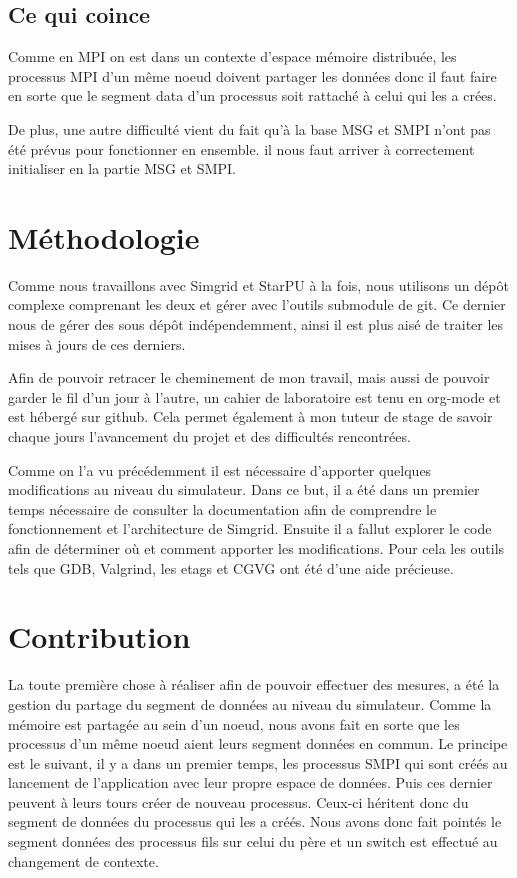 \documentclass[smallextended]{svjour3}
\begin{document}
\subsection{Ce qui coince}
\label{sec-3-4}
Comme en MPI on est dans un contexte d'espace mémoire distribuée,
les processus MPI d'un même noeud doivent partager les données donc
il faut faire en sorte que le segment data d'un processus soit
rattaché à celui qui les a crées. 

De plus, une autre difficulté vient du fait qu'à la base MSG et
SMPI n'ont pas été prévus pour fonctionner en ensemble. il nous
faut arriver à correctement initialiser en la partie MSG et SMPI.

\section{Méthodologie}
\label{sec-4}
Comme nous travaillons avec Simgrid et StarPU à la fois, nous
utilisons un dépôt complexe comprenant les deux et gérer avec
l'outils submodule de git. Ce dernier nous de gérer des sous dépôt
indépendemment, ainsi il est plus aisé de traiter les mises à jours
de ces derniers.

Afin de pouvoir retracer le cheminement de mon travail, mais aussi
de pouvoir garder le fil d'un jour à l'autre, un cahier de
laboratoire est tenu en org-mode et est hébergé sur github. Cela permet
également à mon tuteur de stage de savoir chaque jours l'avancement
du projet et des difficultés rencontrées.

Comme on l'a vu précédemment il est nécessaire d'apporter quelques
modifications au niveau du simulateur. Dans ce but, il a été dans un premier
temps nécessaire de consulter la documentation afin de comprendre le 
fonctionnement et l'architecture de Simgrid. Ensuite il a fallut
explorer le code afin de déterminer où et comment apporter les
modifications. Pour cela les outils tels que GDB, Valgrind, les
etags et CGVG ont été d'une aide précieuse.

\section{Contribution}
\label{sec-5}
La toute première chose à réaliser afin de pouvoir effectuer des
mesures, a été la gestion du partage du segment de données au niveau
du simulateur. Comme la mémoire est partagée au sein d'un noeud, nous
avons fait en sorte que les processus d'un même noeud aient leurs
segment données en commun. Le principe est le suivant, il y a dans
un premier temps, les processus SMPI qui sont créés au lancement de
l'application avec leur propre espace de données. Puis ces dernier
peuvent à leurs tours créer de nouveau processus. Ceux-ci héritent
donc du segment de données du processus qui les a créés. Nous avons
donc fait pointés le segment données des processus fils sur celui du
père et un switch est effectué au changement de contexte.
\end{document}
